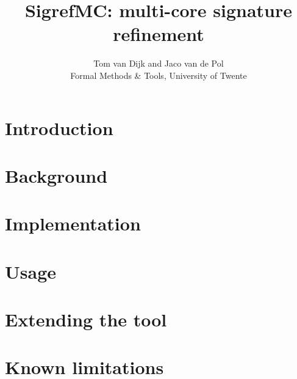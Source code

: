\documentclass{scrreprt}
\begin{document}
\begin{titlepage}
\title{SigrefMC: multi-core signature refinement}
\author{Tom van Dijk and Jaco van de Pol\\[3mm]
Formal Methods \& Tools, University of Twente}
\end{titlepage}

\maketitle

\tableofcontents

\chapter{Introduction}

\label{ch:introduction}


\chapter{Background}


\chapter{Implementation}


\chapter{Usage}


\chapter{Extending the tool}


\chapter{Known limitations}




\end{document}
